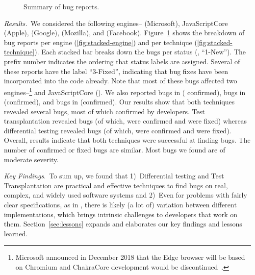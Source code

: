 \documentclass[smallextended]{svjour3}
\begin{document}
\begin{figure}[t]
{    \vspace{-5ex}
  }
  \caption{\label{fig:summary}Summary of bug reports.}
  \vspace{-3ex}
\end{figure}

\sloppy \emph{Results.}~We considered the following engines--\chakra{}
(Microsoft), JavaScriptCore (Apple), \veight{} (Google), \smonkey{}
(Mozilla), and \hermes (Facebook). Figure~\ref{fig:summary} shows the
breakdown of bug reports per engine (\ref{fig:stacked-engine}) and per
technique (\ref{fig:stacked-technique}).  Each stacked bar breaks down
the bugs per status (\eg{}, ``1-New''). The prefix number indicates
the ordering that status labels are assigned. Several of these reports
have the label ``3-Fixed'', indicating that bug fixes have been
incorporated into the code already. Note that most of these bugs
affected two engines--\chakra{}\footnote{Microsoft announced in
  December 2018 that the Edge browser will be based on Chromium and
  ChakraCore development would be
  discontinued~\cite{chakra-discontinued}.} and JavaScriptCore (\jsc).
We also reported \noBugsBugsReportedGoogle{} bugs in \veight{}
(\noBugsBugsConfirmedGoogle{} confirmed), \noBugsBugsReportedHermes
bugs in \hermes (\noBugsBugsConfirmedHermes confirmed), and
\noBugsBugsReportedSMonkey bugs in \smonkey{}
(\noBugsBugsConfirmedSMonkey confirmed).  Our results show that both
techniques revealed several bugs, most of which confirmed by
developers. Test transplantation revealed \noBugsTransplantation bugs
(of which, \noBugsTransplantationConfirmed were confirmed and
\noBugsTransplantationFixed were fixed) whereas differential testing
revealed \noBugsDifferentialTesting bugs (of which,
\noBugsDifferentialTestingConfirmed were confirmed and
\noBugsDifferentialTestingFixed were fixed).  Overall, results
indicate that both techniques were successful at finding bugs. The
number of confirmed or fixed bugs are similar. Most bugs we found are
of moderate severity.



\emph{Key Findings.}~To sum up, we found that 1)~Differential testing
and Test Transplantation are practical and effective techniques to
find bugs on real, complex, and widely used software systems and
2)~Even for problems with fairly clear specifications, as in
\javascript{}, there is likely (a lot of) variation between different
implementations, which brings intrinsic challenges to developers that
work on them.  Section~\ref{sec:lessons} expands and elaborates our
key findings and lessons learned.
\end{document}
